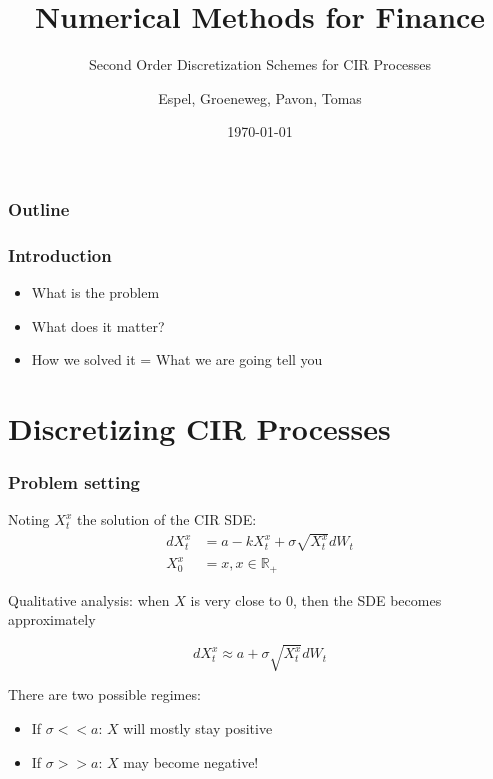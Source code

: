 \documentclass[12pt]{beamer}
\title{Numerical Methods for Finance}
\subtitle{Second Order Discretization Schemes for CIR Processes}
\author{Espel, Groeneweg, Pavon, Tomas}
\institute{Imperial College London}
\date{\today}
\begin{document}
\begin{frame}
    \titlepage
\end{frame}


\begin{frame}
\frametitle{Outline}
\tableofcontents
\end{frame}

\begin{frame}
\frametitle{Introduction}
\begin{itemize}
  \item What is the problem
  \item What does it matter?
  \item How we solved it = What we are going tell you
\end{itemize}
\end{frame}


\section{Discretizing CIR Processes}
\frame{\tableofcontents[currentsection]}

\begin{frame}
\frametitle{Problem setting}
Noting $X^{x}_{t}$ the solution of the CIR SDE:
\begin{align*}
dX^{x}_{t} & = a - kX^{x}_{t} + \sigma \sqrt{X^{x}_{t}} dW_{t} \\
X^{x}_{0} & = x, x \in \mathbb{R_{+}}
\end{align*}

Qualitative analysis: when $X$ is very close to $0$, then the SDE becomes approximately

$$
dX^{x}_{t} \approx a + \sigma \sqrt{X^{x}_{t}} dW_{t}
$$

There are two possible regimes:
\begin{itemize}
	\item If $\sigma << a$: $X$ will mostly stay positive
	\item If $\sigma >> a$: $X$ may become negative!
\end{itemize}
\end{frame}
\end{document}

